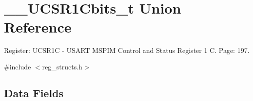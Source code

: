 \hypertarget{union_____u_c_s_r1_cbits__t}{\section{\+\_\+\+\_\+\+U\+C\+S\+R1\+Cbits\+\_\+t Union Reference}
\label{union_____u_c_s_r1_cbits__t}
}


Register\+: U\+C\+S\+R1\+C -\/ U\+S\+A\+R\+T M\+S\+P\+I\+M Control and Status Register 1 C. Page\+: 197.  




{\ttfamily \#include $<$reg\+\_\+structs.\+h$>$}

\subsection*{Data Fields}
